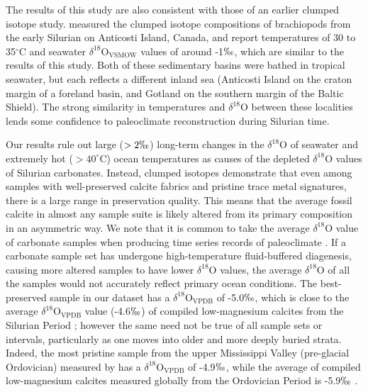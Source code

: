 \documentclass[preprint, authoryear]{elsarticle}
\begin{document}
The results of this study are also consistent with those of an earlier clumped isotope study. \cite{Came2007} measured the clumped isotope compositions of brachiopods from the early Silurian on Anticosti Island, Canada, and report temperatures of 30 to 35$^{\circ}$C and seawater $\delta^{18}$O$_{\text{VSMOW}}$ values of around -1$\permil$, which are similar to the results of this study. Both of these sedimentary basins were bathed in tropical seawater, but each reflects a different inland sea (Anticosti Island on the craton margin of a foreland basin, and Gotland on the southern margin of the Baltic Shield). The strong similarity in temperatures and $\delta^{18}$O between these localities lends some confidence to paleoclimate reconstruction during Silurian time. 

Our results rule out large ($>2\permil$) long-term changes in the $\delta^{18}$O of seawater and extremely hot ($>40^{\circ}$C) ocean temperatures as causes of the depleted $\delta^{18}$O values of Silurian carbonates. Instead, clumped isotopes demonstrate that even among samples with well-preserved calcite fabrics and pristine trace metal signatures, there is a large range in preservation quality. This means that the average fossil calcite in almost any sample suite is likely altered from its primary composition in an asymmetric way. We note that it is common to take the average $\delta^{18}$O value of carbonate samples when producing time series records of paleoclimate \citep{Bickert1997, Jaffres2007, Munnecke2003, Shields2003, Veizer2000}. If a carbonate sample set has undergone high-temperature fluid-buffered diagenesis, causing more altered samples to have lower $\delta^{18}$O values, the average $\delta^{18}$O of all the samples would not accurately reflect primary ocean conditions. The best-preserved sample in our dataset has a $\delta^{18}$O$_{\text{VPDB}}$ of -5.0$\permil$, which is close to the average $\delta^{18}$O$_{\text{VPDB}}$ value (-4.6$\permil$) of compiled low-magnesium calcites from the Silurian Period \citep{Veizer1999}; however the same need not be true of all sample sets or intervals, particularly as one moves into older and more deeply buried strata. Indeed, the most pristine sample from the upper Mississippi Valley (pre-glacial Ordovician) measured by \cite{Finnegan2011} has a $\delta^{18}$O$_{\text{VPDB}}$ of -4.9$\permil$, while the average of compiled low-magnesium calcites measured globally from the Ordovician Period is -5.9$\permil$ \citep{Veizer1999}. 
\end{document}
